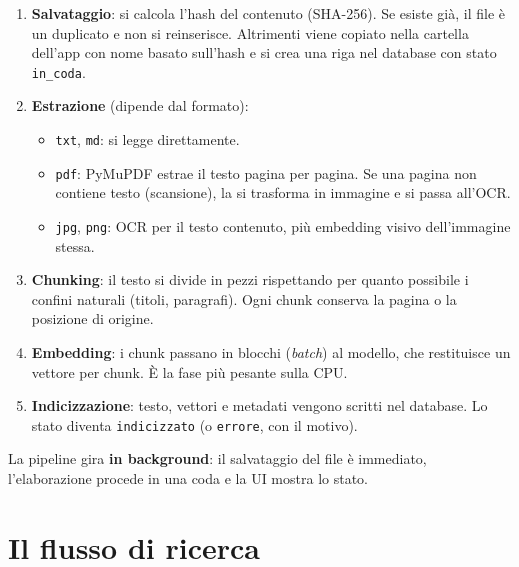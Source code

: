 \documentclass[11pt,a4paper]{article}
\newcommand{\code}[1]{\texttt{\small #1}}
\begin{document}
\begin{enumerate}
  \item \textbf{Salvataggio}: si calcola l'hash del contenuto (SHA-256). Se esiste già, il file è un duplicato e non si reinserisce. Altrimenti viene copiato nella cartella dell'app con nome basato sull'hash e si crea una riga nel database con stato \code{in\_coda}.
  \item \textbf{Estrazione} (dipende dal formato):
  \begin{itemize}
    \item \code{txt}, \code{md}: si legge direttamente.
    \item \code{pdf}: PyMuPDF estrae il testo pagina per pagina. Se una pagina non contiene testo (scansione), la si trasforma in immagine e si passa all'OCR.
    \item \code{jpg}, \code{png}: OCR per il testo contenuto, più embedding visivo dell'immagine stessa.
  \end{itemize}
  \item \textbf{Chunking}: il testo si divide in pezzi rispettando per quanto possibile i confini naturali (titoli, paragrafi). Ogni chunk conserva la pagina o la posizione di origine.
  \item \textbf{Embedding}: i chunk passano in blocchi (\emph{batch}) al modello, che restituisce un vettore per chunk. È la fase più pesante sulla CPU.
  \item \textbf{Indicizzazione}: testo, vettori e metadati vengono scritti nel database. Lo stato diventa \code{indicizzato} (o \code{errore}, con il motivo).
\end{enumerate}

La pipeline gira \textbf{in background}: il salvataggio del file è immediato, l'elaborazione procede in una coda e la UI mostra lo stato.

\section{Il flusso di ricerca}
\end{document}
